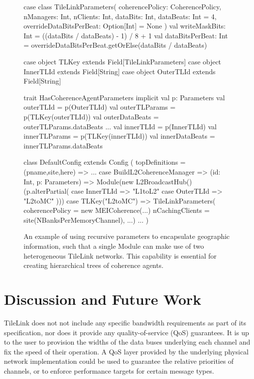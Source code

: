 \begin{figure}
\centering
\begin{scala}
case class TileLinkParameters(
    coherencePolicy: CoherencePolicy,
    nManagers: Int,
    nClients: Int,
    dataBits: Int,
    dataBeats: Int = 4,
    overrideDataBitsPerBeat: Option[Int] = None
    ) {
  val writeMaskBits: Int  = ((dataBits / dataBeats) - 1) / 8 + 1
  val dataBitsPerBeat: Int = overrideDataBitsPerBeat.getOrElse(dataBits / dataBeats)
}

case object TLKey extends Field[TileLinkParameters]
case object InnerTLId extends Field[String]
case object OuterTLId extends Field[String]

trait HasCoherenceAgentParameters {
  implicit val p: Parameters
  val outerTLId = p(OuterTLId)
  val outerTLParams = p(TLKey(outerTLId))
  val outerDataBeats = outerTLParams.dataBeats
  ...
  val innerTLId = p(InnerTLId)
  val innerTLParams = p(TLKey(innerTLId))
  val innerDataBeats = innerTLParams.dataBeats
}

class DefaultConfig extends Config (
  topDefinitions = { (pname,site,here) =>
    ...
      case BuildL2CoherenceManager => (id: Int, p: Parameters) =>
        Module(new L2BroadcastHub()(p.alterPartial({
          case InnerTLId => "L1toL2"
          case OuterTLId => "L2toMC" })))
      case TLKey("L2toMC") =>
        TileLinkParameters(
          coherencePolicy = new MEICoherence(...)
          nCachingClients = site(NBanksPerMemoryChannel), ...)
      ...
})

\end{scala} 
\caption[Using recursive parameters to encapsulate geographic TileLink parameters.]{
An example of using recursive parameters to encapsulate geographic information, such that a single Module can make use of
two heterogeneous TileLink networks.
This capability is essential for creating hierarchical trees of coherence agents.
}
\label{fig:tlgeo}
\end{figure}

\section{Discussion and Future Work}

TileLink does not not include any specific bandwidth requirements as part of its specification,
nor does it provide any quality-of-service (QoS) guarantees.
It is up to the user to provision the widths of the data buses underlying each channel and fix the speed of their operation.  
A QoS layer provided by the underlying physical network implementation could be used 
to guarantee the relative priorities of channels, or to enforce performance targets for certain message types.

